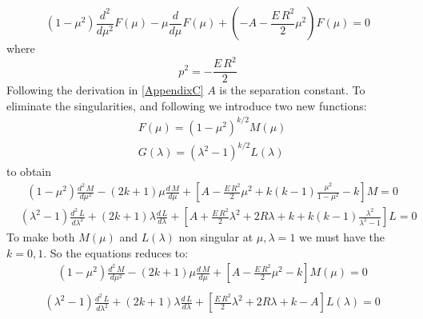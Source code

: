 \begin{equation}
 \left(1 - \mu^2 \right) \frac{d^2}{ d\mu^2 }F(\mu) - \mu\frac{ d }{d\mu }F(\mu) +  \left(-A -  \frac{E\,R^2}{2}\mu^2  \right)F(\mu) = 0
\end{equation}
where
\begin{equation}\label{eqP}
p^2 = -\frac{E\,R^2}{2}
\end{equation}
Following the derivation in \ref{AppendixC}
$ A $ is the separation constant.  To eliminate the singularities, and following \cite{H2Plus2d1} we introduce two new functions:
\begin{equation}\label{eqNew}
\begin{split}
& F(\mu) = (1-\mu^2)^{k/2}M(\mu) \\[.8em]
& G(\lambda) = (\lambda^2-1)^{k/2}L(\lambda)
\end{split}
\end{equation}
to obtain
\begin{equation}
\begin{split}
& (1-\mu^2)\frac{d^2\,M}{d\mu^2} - (2k+1)\mu\frac{d\,M}{d\mu} +   \left[ A -  \frac{E\,R^2}{2}\mu^2  + k(k-1)\frac{\mu^2}{1-\mu^2} - k  \right]M = 0
\end{split}
\end{equation}
\begin{equation}
\begin{split}
& (\lambda^2-1)\frac{d^2\,L}{d\lambda^2} + (2k+1)\lambda \frac{d\,L}{d\lambda} +  \left[A + \frac{E\,R^2}{2}\lambda^2 + 2R\lambda  + k + k(k-1)\frac{\lambda^2}{\lambda^2-1} \right]L = 0
\end{split}
\end{equation}
To make both $ M(\mu) $ and $ L(\lambda) $ non singular at $ \mu, \lambda= 1$ we must have the $ k = 0, 1 $. So the equations reduces to:
\begin{equation}\label{M1}
\begin{split}
& (1-\mu^2)\frac{d^2\,M}{d\mu^2}  - (2k+1)\mu\frac{d\,M}{d\mu} +   \left[ A -  \frac{E\,R^2}{2}\mu^2  -  k  \right]M(\mu) = 0 \\[.8em]
\end{split}
\end{equation}
\begin{equation}\label{L1}
\begin{split}
& (\lambda^2-1)\frac{d^2\,L}{d\lambda^2} + (2k+1)\lambda \frac{d\,L}{d\lambda} +  \left[\frac{E\,R^2}{2}\lambda^2 + 2R\lambda  + k - A\right]L(\lambda) = 0
\end{split}
\end{equation}

